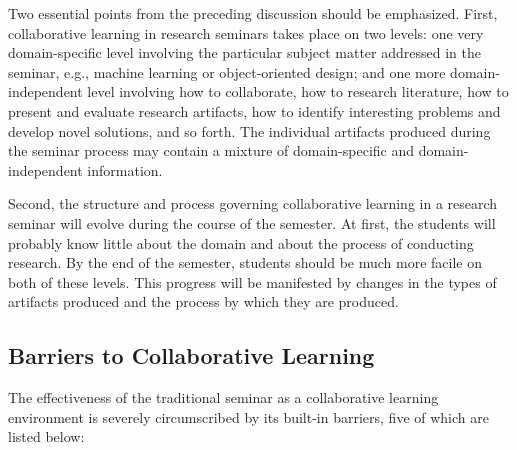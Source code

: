 Two essential points from the preceding discussion should be emphasized.
First, collaborative learning in research seminars takes place on two
levels: one very domain-specific level involving the particular subject
matter addressed in the seminar, e.g., machine learning or object-oriented
design; and one more domain-independent level involving how to collaborate,
how to research literature, how to present and evaluate research artifacts,
how to identify interesting problems and develop novel solutions, and so
forth. The individual artifacts produced during the seminar process may
contain a mixture of domain-specific and domain-independent information.

Second, the structure and process governing collaborative learning in a
research seminar will evolve during the course of the semester. At first,
the students will probably know little about the domain and about the
process of conducting research. By the end of the semester, students should
be much more facile on both of these levels.  This progress will be
manifested by changes in the types of artifacts produced and the process by
which they are produced.


\subsection{Barriers to Collaborative Learning} \label{sec-barriers}

The effectiveness of the traditional seminar as a collaborative learning
environment is severely circumscribed by its built-in barriers, five of
which are listed below:

